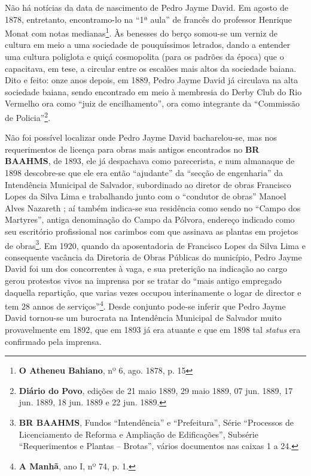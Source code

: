 Não há notícias da data de nascimento de Pedro Jayme David. Em agosto de 1878, entretanto, encontramo-lo na ``1ª aula'' de francês do professor Henrique Monat com notas medianas\footnote{\textbf{O Atheneu Bahiano}, nº 6, ago. 1878, p. 15}. Às benesses do berço somou-se um verniz de cultura em meio a uma sociedade de pouquíssimos letrados, dando a entender uma cultura poliglota e quiçá cosmopolita (para os padrões da época) que o capacitava, em tese, a circular entre os escalões mais altos da sociedade baiana. Dito e feito: onze anos depois, em 1889, Pedro Jayme David já circulava na alta sociedade baiana, sendo encontrado em meio à membresia do Derby Club do Rio Vermelho ora como ``juiz de encilhamento'', ora como integrante da ``Commissão de Policia''\footnote{\textbf{Diário do Povo}, edições de 21 maio 1889, 29 maio 1889, 07 jun. 1889, 17 jun. 1889, 18 jun. 1889 e 22 jun. 1889.}. 

Não foi possível localizar onde Pedro Jayme David bacharelou-se, mas nos requerimentos de licença para obras mais antigos encontrados no \textbf{BR BAAHMS}, de 1893, ele já despachava como parecerista, e num almanaque de 1898 descobre-se que ele era então ``ajudante'' da ``secção de engenharia'' da Intendência Municipal de Salvador, subordinado ao diretor de obras Francisco Lopes da Silva Lima e trabalhando junto com o ``condutor de obras'' Manoel Alves Nazareth \cite[p.~278]{reis_almanak_1898}; aí também indica-se sua residência como sendo no ``Campo dos Martyres'', antiga denominação do Campo da Pólvora, endereço indicado como seu escritório profissional nos carimbos com que assinava as plantas em projetos de obras\footnote{\textbf{BR BAAHMS}, Fundos ``Intendência'' e ``Prefeitura'', Série ``Processos de Licenciamento de Reforma e Ampliação de Edificações'', Subsérie ``Requerimentos e Plantas -- Brotas'', vários documentos nas caixas 1 a 24.}. Em 1920, quando da aposentadoria de Francisco Lopes da Silva Lima e consequente vacância da Diretoria de Obras Públicas do município, Pedro Jayme David foi um dos concorrentes à vaga, e sua preterição na indicação ao cargo gerou protestos vivos na imprensa por se tratar do ``mais antigo empregado daquella repartição, que varias vezes occupou interinamente o logar de director e tem 28 annos de serviços''\footnote{\textbf{A Manhã}, ano I, nº 74, p. 1.}. Desde conjunto pode-se inferir que Pedro Jayme David tornou-se um burocrata na Intendência Municipal de Salvador muito provavelmente em 1892, que em 1893 já era atuante e que em 1898 tal \textit{status} era confirmado pela imprensa.

